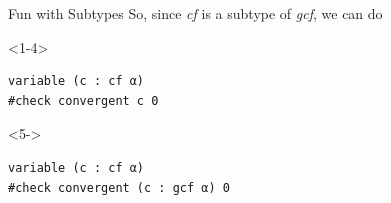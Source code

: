 \documentclass{beamer}
\begin{document}
\begin{frame}[fragile]{Fun with Subtypes}
So, since \emph{cf} is a subtype of \emph{gcf}, we can do
\begin{onlyenv}<1-4>
\begin{verbatim}
variable (c : cf α)
#check convergent c 0
\end{verbatim}
\end{onlyenv}
\begin{onlyenv}<5->
\begin{verbatim}
variable (c : cf α)
#check convergent (c : gcf α) 0
\end{verbatim}
\end{onlyenv}
\end{frame}
\end{document}
